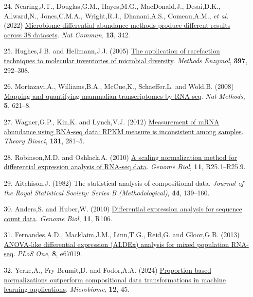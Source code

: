 \documentclass[
]{article}
\newlength{\cslhangindent}
\newenvironment{CSLReferences}[2] %
 {\begin{list}{}{%
  \setlength{\itemindent}{0pt}
  \setlength{\leftmargin}{0pt}
  \setlength{\parsep}{0pt}
  \ifodd #1
   \setlength{\leftmargin}{\cslhangindent}
   \setlength{\itemindent}{-1\cslhangindent}
  \fi
  \setlength{\itemsep}{#2\baselineskip}}}
 {\end{list}}
\begin{document}
\begin{CSLReferences}{1}{1}
24. Nearing,J.T., Douglas,G.M., Hayes,M.G., MacDonald,J., Desai,D.K.,
Allward,N., Jones,C.M.A., Wright,R.J., Dhanani,A.S., Comeau,A.M.,
\emph{et al.} (2022)
\href{https://doi.org/10.1038/s41467-022-28034-z}{Microbiome
differential abundance methods produce different results across 38
datasets}. \emph{Nat Commun}, \textbf{13}, 342.

25. Hughes,J.B. and Hellmann,J.J. (2005)
\href{https://doi.org/10.1016/S0076-6879(05)97017-1}{The application of
rarefaction techniques to molecular inventories of microbial diversity}.
\emph{Methods Enzymol}, \textbf{397}, 292--308.

26. Mortazavi,A., Williams,B.A., McCue,K., Schaeffer,L. and Wold,B.
(2008) \href{https://doi.org/10.1038/nmeth.1226}{Mapping and quantifying
mammalian transcriptomes by {RNA-seq}}. \emph{Nat Methods}, \textbf{5},
621--8.

27. Wagner,G.P., Kin,K. and Lynch,V.J. (2012)
\href{https://doi.org/10.1007/s12064-012-0162-3}{Measurement of mRNA
abundance using RNA-seq data: RPKM measure is inconsistent among
samples}. \emph{Theory Biosci}, \textbf{131}, 281--5.

28. Robinson,M.D. and Oshlack,A. (2010)
\href{https://doi.org/10.1186/gb-2010-11-3-r25}{A scaling normalization
method for differential expression analysis of {RNA-seq} data}.
\emph{Genome Biol}, \textbf{11}, R25.1--R25.9.

29. Aitchison,J. (1982) The statistical analysis of compositional data.
\emph{Journal of the Royal Statistical Society: Series B
(Methodological)}, \textbf{44}, 139--160.

30. Anders,S. and Huber,W. (2010)
\href{https://doi.org/10.1186/gb-2010-11-10-r106}{Differential
expression analysis for sequence count data}. \emph{Genome Biol},
\textbf{11}, R106.

31. Fernandes,A.D., Macklaim,J.M., Linn,T.G., Reid,G. and Gloor,G.B.
(2013) \href{https://doi.org/10.1371/journal.pone.0067019}{ANOVA-like
differential expression (ALDEx) analysis for mixed population RNA-seq}.
\emph{PLoS One}, \textbf{8}, e67019.

32. Yerke,A., Fry Brumit,D. and Fodor,A.A. (2024)
\href{https://doi.org/10.1186/s40168-023-01747-z}{Proportion-based
normalizations outperform compositional data transformations in machine
learning applications}. \emph{Microbiome}, \textbf{12}, 45.


\end{CSLReferences}
\end{document}
